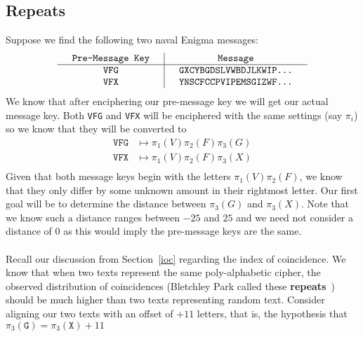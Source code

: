 \subsection{Repeats}
Suppose we find the following two naval Enigma messages:
\[
  \setlength{\arraycolsep}{15pt}
  \begin{array}{c | c}
    \texttt{Pre-Message Key} & \texttt{Message}                \\
    \hline
    \texttt{VFG}             & \texttt{GXCYBGDSLVWBDJLKWIP...} \\
    \texttt{VFX}             & \texttt{YNSCFCCPVIPEMSGIZWF...} \\
  \end{array}
\]
We know that after enciphering our pre-message key we will get our
actual message key. Both \texttt{VFG} and \texttt{VFX} will be
enciphered with the same settings (say $\pi_i$) so we know that
they will be converted to
\begin{align*}
  \texttt{VFG} & \mapsto \pi_1(V)\pi_2(F)\pi_3(G) \\
  \texttt{VFX} & \mapsto \pi_1(V)\pi_2(F)\pi_3(X) \\
\end{align*}
Given that both message keys begin with the letters
$\pi_1(V)\pi_2(F)$, we know that they only differ by some
unknown amount in their rightmost letter. Our first goal will be to
determine the distance between $\pi_3(G)$ and $\pi_3(X)$.
Note that we know such a distance ranges between $-25$ and $25$ and
we need not consider a distance of $0$ as this would imply the
pre-message keys are the same.
\\\\Recall our discussion from Section~\ref{ioc} regarding the
index of coincidence. We know that when two texts represent the
same poly-alphabetic cipher, the observed distribution of coincidences
(Bletchley Park called these {\bf{repeats}}~\cite[p.~95]{Alexander1945}) should be much higher
than two texts representing random text. Consider aligning our two
texts with an offset of $+11$ letters, that is, the hypothesis that
$\pi_3(\texttt{G}) = \pi_3(\texttt{X}) + 11$
\begin{center}
\end{center}
